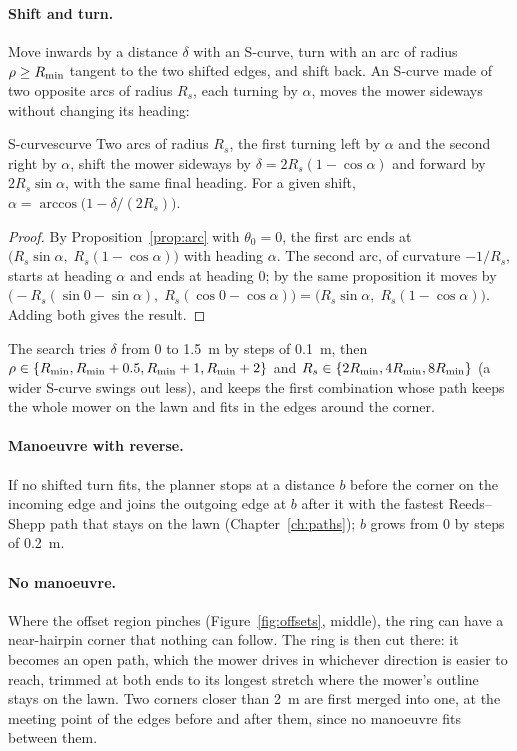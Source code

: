 \paragraph{Shift and turn.}
Move inwards by a distance $\delta$ with an S-curve, turn with an arc of
radius $\rho \ge R_{\min}$ tangent to the two shifted edges, and shift back.
An S-curve made of two opposite arcs of radius $R_s$, each turning by
$\alpha$, moves the mower sideways without changing its heading:

\begin{proposition}{S-curve}{scurve}
  Two arcs of radius $R_s$, the first turning left by $\alpha$ and the
  second right by $\alpha$, shift the mower sideways by
  $\delta = 2R_s(1 - \cos\alpha)$ and forward by $2R_s\sin\alpha$, with the
  same final heading. For a given shift,
  $\alpha = \arccos\bigl(1 - \delta/(2R_s)\bigr)$.
\end{proposition}

\begin{proof}
  By Proposition~\ref{prop:arc} with $\theta_0 = 0$, the first arc ends at
  $\bigl(R_s\sin\alpha,\; R_s(1 - \cos\alpha)\bigr)$ with heading $\alpha$.
  The second arc, of curvature $-1/R_s$, starts at heading $\alpha$ and ends
  at heading $0$; by the same proposition it moves by
  $\bigl(-R_s(\sin 0 - \sin\alpha),\; R_s(\cos 0 - \cos\alpha)\bigr) =
  \bigl(R_s\sin\alpha,\; R_s(1 - \cos\alpha)\bigr)$. Adding both gives the
  result.
\end{proof}

The search tries $\delta$ from $0$ to \SI{1.5}{\metre} by steps of
\SI{0.1}{\metre}, then $\rho \in \{R_{\min}, R_{\min} + 0.5, R_{\min} + 1, R_{\min} +
2\}$ and $R_s \in \{2R_{\min}, 4R_{\min}, 8R_{\min}\}$ (a wider S-curve swings out
less), and keeps the first combination whose path keeps the whole mower on
the lawn and fits in the edges around the corner.

\paragraph{Manoeuvre with reverse.}
If no shifted turn fits, the planner stops at a distance $b$ before the
corner on the incoming edge and joins the outgoing edge at $b$ after it with
the fastest Reeds--Shepp path that stays on the lawn
(Chapter~\ref{ch:paths}); $b$ grows from $0$ by steps of
\SI{0.2}{\metre}.

\paragraph{No manoeuvre.}
Where the offset region pinches (Figure~\ref{fig:offsets}, middle), the ring
can have a near-hairpin corner that nothing can follow. The ring is then cut
there: it becomes an open path, which the mower drives in whichever
direction is easier to reach, trimmed at both ends to its longest stretch
where the mower's outline stays on the lawn. Two corners closer than \SI{2}{\metre} are
first merged into one, at the meeting point of the edges before and after
them, since no manoeuvre fits between them.

